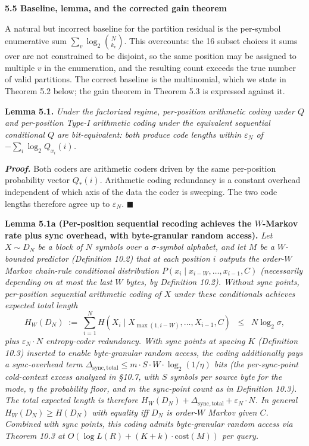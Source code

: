 \documentclass[
]{article}
\begin{document}
\textbf{5.5 Baseline, lemma, and the corrected gain theorem}

A natural but incorrect baseline for the partition residual is the
per-symbol enumerative sum $\sum_v \log_2 \binom{N}{k_v}$. This
overcounts: the 16 subset choices it sums over are not constrained to
be disjoint, so the same position may be assigned to multiple $v$ in
the enumeration, and the resulting count exceeds the true number of
valid partitions. The correct baseline is the multinomial, which we
state in Theorem 5.2 below; the gain theorem in Theorem 5.3 is
expressed against it.

\textbf{Lemma 5.1.} \emph{Under the factorized regime, per-position
arithmetic coding under $Q$ and per-position Type-I arithmetic coding
under the equivalent sequential conditional $Q$ are bit-equivalent:
both produce code lengths within $\varepsilon_N$ of
$-\sum_i \log_2 Q_{x_i}(i)$.}

\emph{\textbf{Proof.}} Both coders are arithmetic coders driven by the
same per-position probability vector $Q_*(i)$. Arithmetic coding
redundancy is a constant overhead independent of which axis of the
data the coder is sweeping. The two code lengths therefore agree up to
$\varepsilon_N$. \hfill$\blacksquare$

\textbf{Lemma 5.1a (Per-position sequential recoding achieves the
$W$-Markov rate plus sync overhead, with byte-granular random
access).} \emph{Let $X \sim D_N$ be a block of $N$ symbols over a
$\sigma$-symbol alphabet, and let $M$ be a $W$-bounded predictor
(Definition 10.2) that at each position $i$ outputs the order-$W$
Markov chain-rule conditional distribution
$P(x_i \mid x_{i-W}, \dots, x_{i-1}, C)$ (necessarily depending on
at most the last $W$ bytes, by Definition 10.2). Without sync
points, per-position sequential arithmetic coding of $X$ under
these conditionals achieves expected total length}
\[
H_W(D_N) \;:=\; \sum_{i=1}^N H(X_i \mid X_{\max(1, i-W)}, \dots, X_{i-1}, C)
\;\;\leq\;\; N \log_2 \sigma,
\]
\emph{plus $\varepsilon_N \cdot N$ entropy-coder redundancy. With
sync points at spacing $K$ (Definition 10.3) inserted to enable
byte-granular random access, the coding additionally pays a
sync-overhead term $\Delta_{\mathrm{sync, total}} \leq m \cdot S
\cdot W \cdot \log_2(1/\eta)$ bits (the per-sync-point cold-context
excess analyzed in §10.7, with $S$ symbols per source byte for the
mode, $\eta$ the probability floor, and $m$ the sync-point count
as in Definition 10.3). The total expected length is therefore
$H_W(D_N) + \Delta_{\mathrm{sync, total}} + \varepsilon_N \cdot N$.
In general $H_W(D_N) \geq H(D_N)$ with equality iff $D_N$ is
order-$W$ Markov given $C$. Combined with sync points, this coding
admits byte-granular random access via Theorem 10.3 at
$O(\log L(R) + (K+k) \cdot \mathrm{cost}(M))$ per query.}
\end{document}
